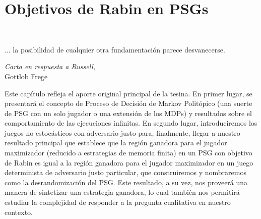 \chapter{Objetivos de Rabin en PSGs}
~\label{cap:results}
\vspace{-1cm}
\epigraph{... la posibilidad de cualquier otra fundamentación parece desvanecerse.}{\textit{Carta en respuesta a Russell}, \\ Gottlob Frege}

Este capítulo refleja el aporte original principal de la tesina. En primer
lugar, se presentará el concepto de Proceso de Decisión de Markov Politópico
(una suerte de PSG con un solo jugador o una extensión de los MDPs) y
resultados sobre el comportamiento de las ejecuciones infinitas. En segundo
lugar, introduciremos los juegos no-estocásticos con adversario justo para,
finalmente, llegar a nuestro resultado principal que establece que la región
ganadora para el jugador maximizador (reducido a estrategias de memoria finita)
en un PSG con objetivo de Rabin es igual a la región ganadora para el jugador
maximizador en un juego determinista de adversario justo particular, que
construiremos y nombraremos como la desrandomización del PSG. Este resultado, a
su vez, nos proveerá una manera de sintetizar una estrategia ganadora, lo cual
también nos permitirá estudiar la complejidad de responder a la pregunta
cualitativa en nuestro contexto.




